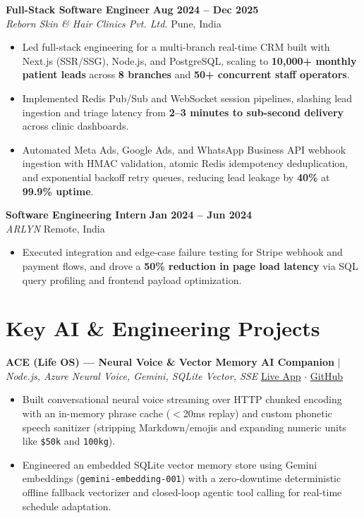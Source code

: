 \documentclass[a4paper,9pt]{article}
\begin{document}
\vspace{2pt}
\textbf{Full-Stack Software Engineer} \hfill \textbf{Aug 2024 -- Dec 2025} \\
\textit{Reborn Skin \& Hair Clinics Pvt. Ltd.} \hfill Pune, India
\begin{itemize}
    \item Led full-stack engineering for a multi-branch real-time CRM built with Next.js (SSR/SSG), Node.js, and PostgreSQL, scaling to \textbf{10,000+ monthly patient leads} across \textbf{8 branches} and \textbf{50+ concurrent staff operators}.
    \item Implemented Redis Pub/Sub and WebSocket session pipelines, slashing lead ingestion and triage latency from \textbf{2--3 minutes to sub-second delivery} across clinic dashboards.
    \item Automated Meta Ads, Google Ads, and WhatsApp Business API webhook ingestion with HMAC validation, atomic Redis idempotency deduplication, and exponential backoff retry queues, reducing lead leakage by \textbf{40\%} at \textbf{99.9\% uptime}.
\end{itemize}

\vspace{2pt}
\textbf{Software Engineering Intern} \hfill \textbf{Jan 2024 -- Jun 2024} \\
\textit{ARLYN} \hfill Remote, India
\begin{itemize}
    \item Executed integration and edge-case failure testing for Stripe webhook and payment flows, and drove a \textbf{50\% reduction in page load latency} via SQL query profiling and frontend payload optimization.
\end{itemize}

\section*{Key AI \& Engineering Projects}

\textbf{ACE (Life OS) --- Neural Voice \& Vector Memory AI Companion} $|$ \textit{Node.js, Azure Neural Voice, Gemini, SQLite Vector, SSE} \hfill \href{https://ace.stealthgrowth.in}{Live App} $\cdot$ \href{https://github.com/harshalsawatkar/ace-}{GitHub}
\begin{itemize}
    \item Built conversational neural voice streaming over HTTP chunked encoding with an in-memory phrase cache ($<$20ms replay) and custom phonetic speech sanitizer (stripping Markdown/emojis and expanding numeric units like \texttt{\$50k} and \texttt{100kg}).
    \item Engineered an embedded SQLite vector memory store using Gemini embeddings (\texttt{gemini-embedding-001}) with a zero-downtime deterministic offline fallback vectorizer and closed-loop agentic tool calling for real-time schedule adaptation.
\end{itemize}
\end{document}
